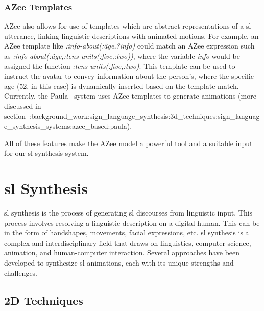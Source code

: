 \documentclass[../../main.tex]{subfiles}
\begin{document}
\subsubsection{AZee Templates}
\label{ch:background_work:sign_language_descriptions:azee:templates}

AZee also allows for use of templates which are abstract representations of a \gls{sl} utterance, linking linguistic descriptions with animated motions. For example, an AZee template like \emph{:info-about(:âge,?info)} could match an AZee expression such as \emph{:info-about(:âge,:tens-units(:five,:two))}, where the variable \emph{info} would be assigned the function \emph{:tens-units(:five,:two)}. This template can be used to instruct the avatar to convey information about the person's, where the specific age (52, in this case) is dynamically inserted based on the template match. Currently, the Paula~\cite{mcdonald2016automated} system uses AZee templates to generate animations (more discussed in section~:background_work:sign_language_synthesis:3d_techniques:sign_language_synthesis_systems:azee_based:paula).

All of these features make the AZee model a powerful tool and a suitable input for our \gls{sl} synthesis system.

\section{\gls{sl} Synthesis}
\label{ch:background_work:sign_language_synthesis}

\gls{sl} synthesis is the process of generating \gls{sl} discourses from linguistic input. This process involves resolving a linguistic description on a digital human. This can be in the form of handshapes, movements, facial expressions, etc. \gls{sl} synthesis is a complex and interdisciplinary field that draws on linguistics, computer science, animation, and human-computer interaction. Several approaches have been developed to synthesize \gls{sl} animations, each with its unique strengths and challenges.

\subsection{2D Techniques}
\label{ch:background_work:sign_language_synthesis:2d_techniques}
\end{document}
